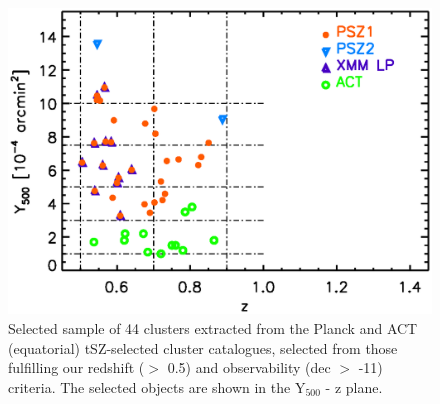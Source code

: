 \documentclass[11pt,a4paper,twoside,graphicx,color]{article}
\begin{document}
\begin{figure}
  \centering
   \includegraphics[width=0.8\columnwidth]{./Figures/NIKA2_selected_sample_y_withCL_xmm.eps}
\caption{{\small Selected sample of 44 clusters extracted from the Planck and ACT (equatorial) tSZ-selected cluster catalogues, selected from those fulfilling our redshift ($>$ 0.5) and observability (dec $>$ -11) criteria. The selected objects are shown in the Y$_{500}$ - z plane.}} %
\label{Fig:sample}
\end{figure}
\end{document}
